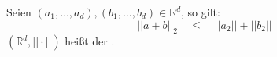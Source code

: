 Seien $(a_1, \dots, a_d), (b_1, \dots, b_d) \in \mathbb{R}^d$, so gilt:
$$||a+b||_2 \quad \leq \quad ||a_2|| + ||b_2||$$
$(\mathbb{R}^d, ||\cdot||)$ heißt der .